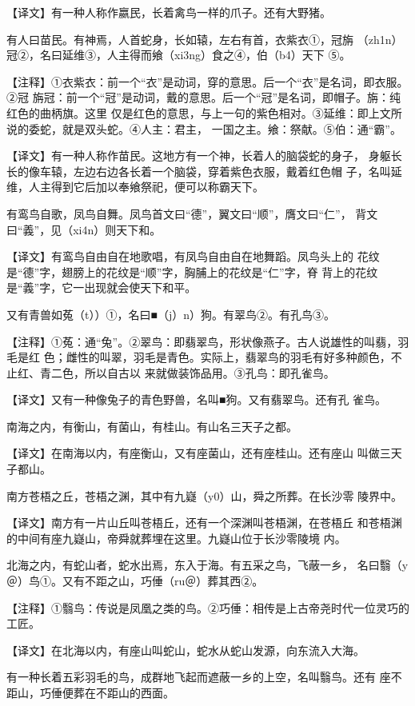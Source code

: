 \documentclass[a4paper,12pt,UTF8,twoside]{ctexbook}
\begin{document}
【译文】有一种人称作嬴民，长着禽鸟一样的爪子。还有大野猪。

有人曰苗民。有神焉，人首蛇身，长如辕，左右有首，衣紫衣①，冠旃 （zh1n）冠②，名曰延维③，人主得而飨（xi3ng）食之④，伯（b4）天下 ⑤。

【注释】①衣紫衣：前一个“衣”是动词，穿的意思。后一个“衣”是名词，即衣服。②冠 旃冠：前一个“冠”是动词，戴的意思。后一个“冠”是名词，即帽子。旃：纯红色的曲柄旗。这里 仅是红色的意思，与上一句的紫色相对。③延维：即上文所说的委蛇，就是双头蛇。④人主：君主， 一国之主。飨：祭献。⑤伯：通“霸”。

【译文】有一种人称作苗民。这地方有一个神，长着人的脑袋蛇的身子， 身躯长长的像车辕，左边右边各长着一个脑袋，穿着紫色衣服，戴着红色帽 子，名叫延维，人主得到它后加以奉飨祭祀，便可以称霸天下。

有鸾鸟自歌，凤鸟自舞。凤鸟首文曰“德”，翼文曰“顺”，膺文曰“仁”， 背文曰“義”，见（xi4n）则天下和。

【译文】有鸾鸟自由自在地歌唱，有凤鸟自由自在地舞蹈。凤鸟头上的 花纹是“德”字，翅膀上的花纹是“顺”字，胸脯上的花纹是“仁”字，脊 背上的花纹是“義”字，它一出现就会使天下和平。

又有青兽如菟（t））①，名曰■（j）n）狗。有翠鸟②。有孔鸟③。

【注释】①菟：通“兔”。②翠鸟：即翡翠鸟，形状像燕子。古人说雄性的叫翡，羽毛是红 色；雌性的叫翠，羽毛是青色。实际上，翡翠鸟的羽毛有好多种颜色，不止红、青二色，所以自古以 来就做装饰品用。③孔鸟：即孔雀鸟。

【译文】又有一种像兔子的青色野兽，名叫■狗。又有翡翠鸟。还有孔 雀鸟。

南海之内，有衡山，有菌山，有桂山。有山名三天子之都。

【译文】在南海以内，有座衡山，又有座菌山，还有座桂山。还有座山 叫做三天子都山。

南方苍梧之丘，苍梧之渊，其中有九嶷（y0）山，舜之所葬。在长沙零 陵界中。

【译文】南方有一片山丘叫苍梧丘，还有一个深渊叫苍梧渊，在苍梧丘 和苍梧渊的中间有座九嶷山，帝舜就葬埋在这里。九嶷山位于长沙零陵境 内。

北海之内，有蛇山者，蛇水出焉，东入于海。有五采之鸟，飞蔽一乡， 名曰翳（y＠）鸟①。又有不距之山，巧倕（ru＠）葬其西②。

【注释】①翳鸟：传说是凤凰之类的鸟。②巧倕：相传是上古帝尧时代一位灵巧的工匠。

【译文】在北海以内，有座山叫蛇山，蛇水从蛇山发源，向东流入大海。

有一种长着五彩羽毛的鸟，成群地飞起而遮蔽一乡的上空，名叫翳鸟。还有 座不距山，巧倕便葬在不距山的西面。
\end{document}
